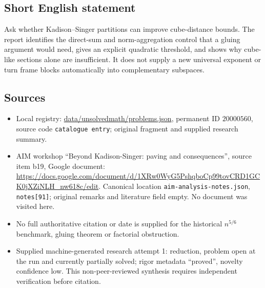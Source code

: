 \documentclass[11pt]{article}
\begin{document}
\subsection{Short English statement}
Ask whether Kadison--Singer partitions can improve cube-distance bounds. The report identifies the direct-sum and norm-aggregation control that a gluing argument would need, gives an explicit quadratic threshold, and shows why cube-like sections alone are insufficient. It does not supply a new universal exponent or turn frame blocks automatically into complementary subspaces.
\subsection{Sources}
\begin{itemize}
\item Local registry: \url{data/unsolvedmath/problems.json}, permanent ID $20000560$, source code \texttt{catalogue entry}; original fragment and supplied research summary.
\item AIM workshop ``Beyond Kadison-Singer: paving and consequences'', source item b19, Google document: \url{https://docs.google.com/document/d/1XRw0WyG5PshqboCp99tovCRD1GCK0jXZiNLH_nw618c/edit}. Canonical location \texttt{aim-analysis-notes.json}, \texttt{notes[91]}; original remarks and literature field empty. No document was visited here.
\item No full authoritative citation or date is supplied for the historical $n^{5/6}$ benchmark, gluing theorem or factorial obstruction.
\item Supplied machine-generated research attempt 1: reduction, problem open at the run and currently partially solved; rigor metadata ``proved'', novelty confidence low. This non-peer-reviewed synthesis requires independent verification before citation.
\end{itemize}
\end{document}
